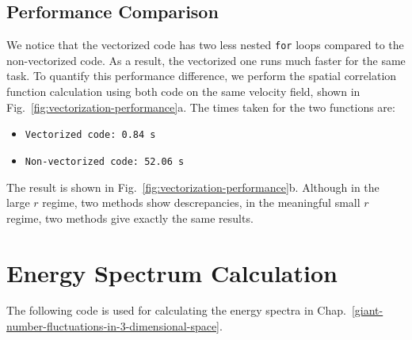 \subsection{Performance Comparison}
We notice that the vectorized code has two less nested \texttt{for} loops compared to the non-vectorized code. As a result, the vectorized one runs much faster for the same task. To quantify this performance difference, we perform the spatial correlation function calculation using both code on the same velocity field, shown in Fig.~\ref{fig:vectorization-performance}a. The times taken for the two functions are:
\begin{itemize}
  \item \texttt{Vectorized code: 0.84 s}
  \item \texttt{Non-vectorized code: 52.06 s}
\end{itemize}
The result is shown in Fig.~\ref{fig:vectorization-performance}b. Although in the large $r$ regime, two methods show descrepancies, in the meaningful small $r$ regime, two methods give exactly the same results.


\section{Energy Spectrum Calculation}
\label{sec:A-energy-spectra}
The following code is used for calculating the energy spectra in Chap.~\ref{giant-number-fluctuations-in-3-dimensional-space}.

